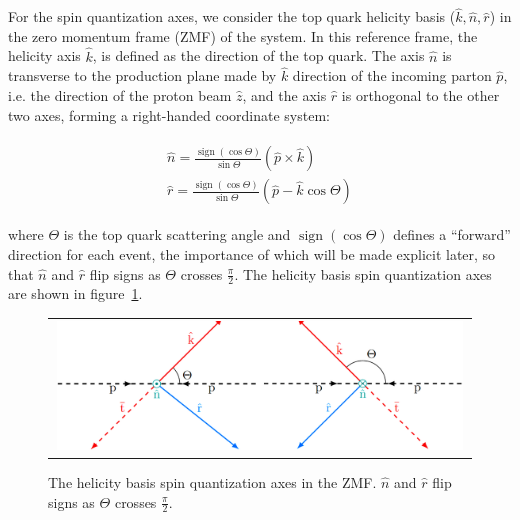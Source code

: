 \begin{refsection}
For the spin quantization axes, we consider the top quark helicity basis ($\hat{k}, \hat{n}, \hat{r}$) in the zero momentum frame (ZMF) of the \ttbar system.
In this reference frame, the helicity axis $\hat{k}$, is defined as the direction of the top quark.
The axis $\hat{n}$ is transverse to the production plane made by $\hat{k}$ direction of the incoming parton $\hat{p}$, i.e. the direction of the proton beam $\hat{z}$, and the axis $\hat{r}$ is orthogonal to the other two axes, forming a right-handed coordinate system:
\begin{linenomath*}
\begin{align}
\begin{array}{c}
\hat{n}=\frac{\operatorname{sign}(\cos \Theta)}{\sin \Theta}(\hat{p} \times \hat{k}) \\
\hat{r}=\frac{\operatorname{sign}(\cos \Theta)}{\sin \Theta}(\hat{p} - \hat{k}\cos \Theta)
\end{array}
\label{helcity_basis}
\end{align}
\end{linenomath*}
where $\Theta$ is the top quark scattering angle and $\operatorname{sign}(\cos \Theta)$ defines a “forward” direction for each event, the importance of which will be made explicit later, so that $\hat{n}$ and $\hat{r}$ flip signs as $\Theta$ crosses $\frac{\pi}{2}$.
The helicity basis spin quantization axes are shown in figure~\ref{helicity_basis}.
\begin{figure}[htb]
  \begin{center}
    \begin{tabular}{c}
        \includegraphics[width=0.99\textwidth]{fig_TopQuark/helicity_basis.png}
    \end{tabular}
    \caption{The helicity basis spin quantization axes in the \ttbar ZMF.
            $\hat{n}$ and $\hat{r}$ flip signs as $\Theta$ crosses $\frac{\pi}{2}$.
            }
    \label{helicity_basis}
  \end{center}
\end{figure}


\end{refsection}
